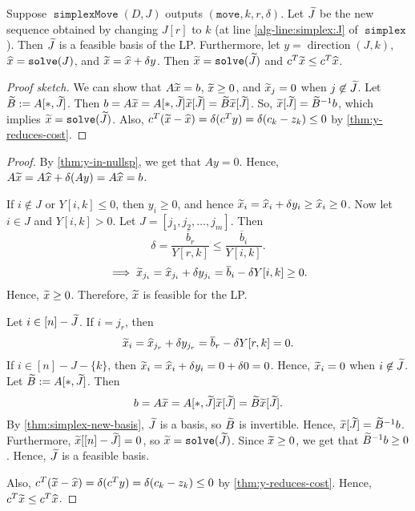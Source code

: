 \documentclass[a4paper, 12pt, fleqn]{article}
\newcommand*{\bline}{\overline{b}}
\DeclareMathOperator{\direction}{direction}
\DeclareMathOperator{\solve}{\mathtt{solve}}
\DeclareMathOperator{\simplex}{\mathtt{simplex}}
\DeclareMathOperator{\simplexMove}{\mathtt{simplexMove}}
\newenvironment*{longProof}{\begin{proof}}{\end{proof}}
\begin{document}
\begin{lemma}
\label{thm:simplex-feasible-basis}
Suppose $\simplexMove(D, J)$ outputs $(\mathtt{move}, k, r, \delta)$.
Let $\widetilde{J}$ be the new sequence obtained by changing $J[r]$ to $k$
(at line \ref{alg-line:simplex:J} of $\simplex$).
Then $\widetilde{J}$ is a feasible basis of the LP.
Furthermore, let $y = \direction(J, k)$, $\xhat = \solve(J)$, and $\widetilde{x} = \widehat{x} + \delta y$.
Then $\xtild = \solve(\Jtild)$ and $c^T\widetilde{x} \le c^T\widehat{x}$.
\end{lemma}
\begin{proof}[Proof sketch]
We can show that $A\widetilde{x} = b$, $\widetilde{x} \ge 0$, and $\widetilde{x}_j = 0$ when $j \not\in \widetilde{J}$.
Let $\widetilde{B} := A[*,\widetilde{J}]$. Then
$b = A\widetilde{x} = A[*,\widetilde{J}]\widetilde{x}[\widetilde{J}] = \widetilde{B}\widetilde{x}[\widetilde{J}]$.
So, $\widetilde{x}[\widetilde{J}] = \widetilde{B}^{-1}b$, which implies $\xtild = \solve(\Jtild)$.
Also, $c^T(\widetilde{x} - \widehat{x}) = \delta(c^Ty) = \delta(c_k - z_k) \le 0$ by \cref{thm:y-reduces-cost}.
\end{proof}
\begin{longProof}
By \cref{thm:y-in-nullsp}, we get that $Ay = 0$.
Hence, $A\widetilde{x} = A\widehat{x} + \delta (Ay) = A\widehat{x} = b$.

If $i \not\in J$ or $Y[i, k] \le 0$, then $y_i \ge 0$,
and hence $\widetilde{x}_i = \widehat{x}_i + \delta y_i \ge \widehat{x}_i \ge 0$.
Now let $i \in J$ and $Y[i,k] > 0$.
Let $J = [j_1, j_2, \ldots, j_m]$. Then
\[ \delta = \frac{\bline_r}{Y[r,k]} \le \frac{\bline_i}{Y[i, k]}. \]
\[ \implies \xtild_{j_i} = \xhat_{j_i} + \delta y_{j_i} = \bline_i - \delta Y[i,k] \ge 0. \]
Hence, $\widetilde{x} \ge 0$. Therefore, $\widetilde{x}$ is feasible for the LP.

Let $i \in [n] - \widetilde{J}$. If $i = j_r$, then
\[ \xtild_i = \xhat_{j_r} + \delta y_{j_r} = \bline_r - \delta Y[r,k] = 0. \]
If $i \in [n] - J - \{k\}$, then $\widetilde{x}_i = \widehat{x}_i + \delta y_i = 0 + \delta 0 = 0$.
Hence, $\widetilde{x}_i = 0$ when $i \not\in \widetilde{J}$.
Let $\widetilde{B} := A[*,\widetilde{J}]$. Then
\[ b = A\widetilde{x} = A[*,\widetilde{J}]\widetilde{x}[\widetilde{J}] = \widetilde{B}\widetilde{x}[\widetilde{J}]. \]
By \cref{thm:simplex-new-basis}, $\widetilde{J}$ is a basis, so $\widetilde{B}$ is invertible.
Hence, $\widetilde{x}[\widetilde{J}] = \widetilde{B}^{-1}b$.
Furthermore, $\widetilde{x}[[n] - \widetilde{J}] = 0$, so $\xtild = \solve(\Jtild)$.
Since $\widetilde{x} \ge 0$, we get that $\widetilde{B}^{-1}b \ge 0$.
Hence, $\widetilde{J}$ is a feasible basis.

Also, $c^T(\widetilde{x} - \widehat{x}) = \delta(c^Ty) = \delta(c_k - z_k) \le 0$ by \cref{thm:y-reduces-cost}.
Hence, $c^T\widetilde{x} \le c^T\widehat{x}$.
\end{longProof}
\end{document}
